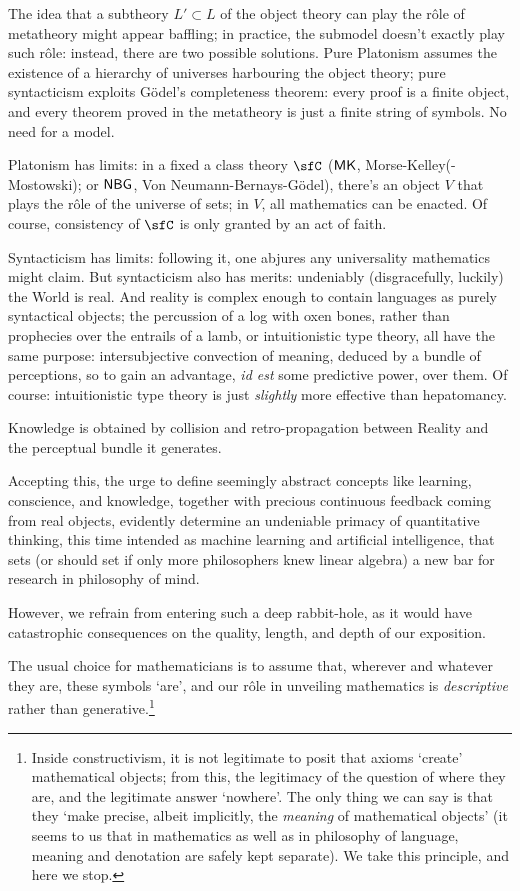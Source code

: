 The idea that a subtheory $L'\subset L$ of the object theory can play the r\^ole of metatheory might appear baffling; in practice, the submodel doesn't exactly play such r\^ole: instead, there are two possible solutions. Pure Platonism assumes the existence of a hierarchy of universes harbouring the object theory; pure syntacticism exploits G\"odel's completeness theorem: every proof is a finite object, and every theorem proved in the metatheory is just a finite string of symbols. No need for a model.

Platonism has limits: in a fixed a class theory $\sfC$ ($\sf MK$, Morse-Kelley(-Mostowski); or $\sf NBG$, Von Neumann-Bernays-G\"odel), there's an object $V$ that plays the r\^ole of the universe of sets; in $V$, all mathematics can be enacted. Of course, consistency of $\sfC$ is only granted by an act of faith.

Syntacticism has limits: following it, one abjures any universality mathematics might claim. But syntacticism also has merits: undeniably (disgracefully, luckily) the World is real. And reality is complex enough to contain languages as purely syntactical objects; the percussion of a log with oxen bones, rather than prophecies over the entrails of a lamb, or intuitionistic type theory, all have the same purpose: intersubjective convection of meaning, deduced by a bundle of perceptions, so to gain an advantage, \emph{id est} some predictive power, over them. Of course: intuitionistic type theory is just \emph{slightly} more effective than hepatomancy.

Knowledge is obtained by collision and retro-propagation between Reality and the perceptual bundle it generates.

Accepting this, the urge to define seemingly abstract concepts like learning, conscience, and knowledge, together with precious continuous feedback coming from real objects, evidently determine an undeniable primacy of quantitative thinking, this time intended as machine learning and artificial intelligence, that sets (or should set if only more philosophers knew linear algebra) a new bar for research in philosophy of mind.

However, we refrain from entering such a deep rabbit-hole, as it would have catastrophic consequences on the quality, length, and depth of our exposition.

The usual choice for mathematicians is to assume that, wherever and whatever they are, these symbols `are', and our r\^ole in unveiling mathematics is \emph{descriptive} rather than generative.\footnote{Inside constructivism, it is not legitimate to posit that axioms `create' mathematical objects; from this, the legitimacy of the question of where they are, and the legitimate answer `nowhere'. The only thing we can say is that they `make precise, albeit implicitly, the \emph{meaning} of mathematical objects' \cite{Agzz} (it seems to us that in mathematics as well as in philosophy of language, meaning and denotation are safely kept separate). We take this principle, and here we stop.}

